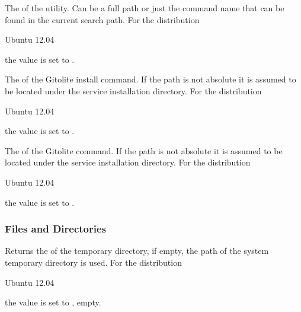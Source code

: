 
The  of the  utility. Can be a full path or
just the command name that can be found in the current search path. 
For the distribution
\begin{inparaitem}
\item[\TheDistribution{ubuntu}] Ubuntu 12.04
\end{inparaitem}
the value is set to .


The  of the Gitolite install command. If the path is not absolute it
is assumed to be located under the service installation directory.
For the distribution
\begin{inparaitem}
\item[\TheDistribution{ubuntu}] Ubuntu 12.04
\end{inparaitem}
the value is set to .


The  of the Gitolite command. If the path is not absolute it
is assumed to be located under the service installation directory.
For the distribution
\begin{inparaitem}
\item[\TheDistribution{ubuntu}] Ubuntu 12.04
\end{inparaitem}
the value is set to .

\subsubsection{Files and Directories}


Returns the  of the temporary directory, if empty, the path
of the system temporary directory is used.
For the distribution
\begin{inparaitem}
\item[\TheDistribution{ubuntu}] Ubuntu 12.04
\end{inparaitem}
the value is set to \qcode{}, empty.

